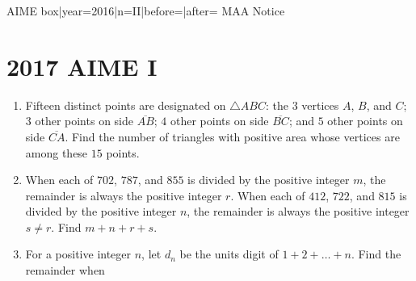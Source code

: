 \documentclass{article}
\begin{document}
\begin{enumerate}[label=\arabic*., itemsep=0.5em]
{{AIME box|year=2016|n=II|before=|after=}}
{{MAA Notice}}\par \vspace{0.5em}\end{enumerate}\newpage\section*{2017 AIME I}\begin{enumerate}[label=\arabic*., itemsep=0.5em]\item Fifteen distinct points are designated on $\triangle ABC$: the 3 vertices $A$, $B$, and $C$; $3$ other points on side $\overline{AB}$; $4$ other points on side $\overline{BC}$; and $5$ other points on side $\overline{CA}$. Find the number of triangles with positive area whose vertices are among these $15$ points.\par \vspace{0.5em}\item When each of $702$, $787$, and $855$ is divided by the positive integer $m$, the remainder is always the positive integer $r$. When each of $412$, $722$, and $815$ is divided by the positive integer $n$, the remainder is always the positive integer $s \neq r$. Find $m+n+r+s$.\par \vspace{0.5em}\item For a positive integer $n$, let $d_n$ be the units digit of $1 + 2 + \dots + n$. Find the remainder when


\end{enumerate}
\end{document}
